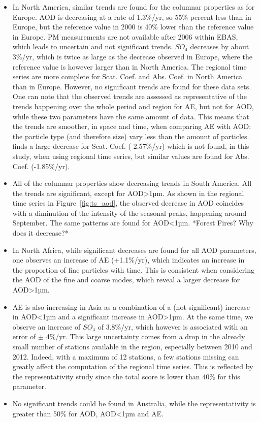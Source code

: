 \documentclass[journal abbreviation, manuscript]{copernicus}
\begin{document}
\begin{itemize}
 \item In North America, similar trends are found for the columnar properties as for Europe. AOD is decreasing at a rate of 1.3\%/yr, so 55\% percent less than in Europe, but the reference value in 2000 is 40\% lower than the reference value in Europe. PM measurements are not available after 2006 within EBAS, which leads to uncertain and not significant trends. $SO_{4}$ decreases by about 3\%/yr, which is twice as large as the decrease observed in Europe, where the reference value is however larger than in North America. The regional time series are more complete for Scat. Coef. and Abs. Coef. in North America than in Europe. However, no significant trends are found for these data sets. One can note that the observed trends are assessed as representative of the trends happening over the whole period and region for AE, but not for AOD, while these two parameters have the same amount of data. This means that the trends are smoother, in space and time, when comparing AE with AOD: the particle type (and therefore size) vary less than the amount of particles. \cite{collaudcoenprep} finds a large decrease for Scat. Coef. (-2.57\%/yr) which is not found, in this study,  when using regional time series, but similar values are found for Abs. Coef. (-1.85\%/yr). 
 \item All of the columnar properties show decreasing trends in South America. All the trends are significant, except for AOD>1µm. As shown in the regional time series in Figure~\ref{fig:ts_aod}, the observed decrease in AOD coincides with a diminution of the intensity of the seasonal peaks, happening around September. The same patterns are found for AOD<1µm. *Forest Fires? Why does it decrease?*
 \item In North Africa, while significant decreases are found for all AOD parameters, one observes an increase of AE (+1.1\%/yr), which indicates an increase in the proportion of fine particles with time. This is consistent when considering the AOD of the fine and coarse modes, which reveal a larger decrease for AOD>1µm.
 \item AE is also increasing in Asia as a combination of a (not significant) increase in AOD<1µm and a significant increase in AOD>1µm. At the same time, we observe an increase of $SO_{4}$ of 3.8\%/yr, which however is associated with an error of ${\pm}$ 4\%/yr. This large uncertainty comes from a drop in the already small number of stations available in the region, especially between 2010 and 2012. Indeed, with a maximum of 12 stations, a few stations missing can greatly affect the computation of the regional time series. This is reflected by the representativity study since the total score is lower than 40\% for this parameter.
 \item No significant trends could be found in Australia, while the representativity is greater than 50\% for AOD, AOD<1µm and AE.

\end{itemize}
\end{document}
